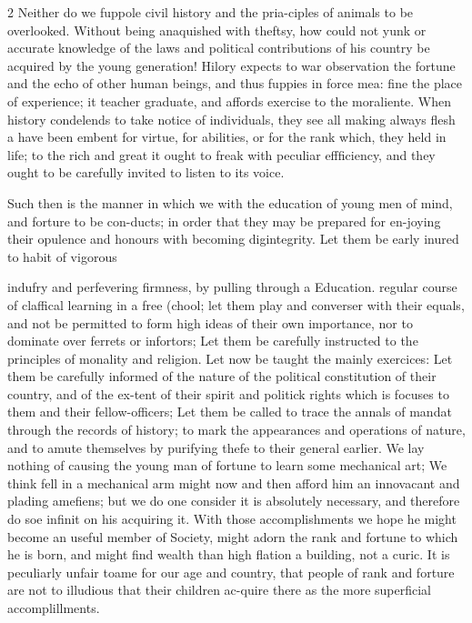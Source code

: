\documentclass[10pt]{article}
\begin{document}
\begin{multicols}{2}
Neither do we fuppole civil history and the pria-ciples of animals to be overlooked. Without being anaquished with theftsy, how could not yunk or accurate knowledge of the laws and political contributions of his country be acquired by the young generation! Hilory expects to war observation the fortune and the echo of other human beings, and thus fuppies in force mea: fine the place of experience; it teacher graduate, and affords exercise to the moraliente. When history condelends to take notice of individuals, they see all making always flesh a have been embent for virtue, for abilities, or for the rank which, they held in life; to the rich and great it ought to freak with peculiar effficiency, and they ought to be carefully invited to listen to its voice.

Such then is the manner in which we with the education of young men of mind, and forture to be con-ducts; in order that they may be prepared for en-joying their opulence and honours with becoming digintegrity. Let them be early inured to habit of vigorous

indufry and perfevering firmness, by pulling through a Education. regular course of claffical learning in a free (chool; let them play and converser with their equals, and not be permitted to form high ideas of their own importance, nor to dominate over ferrets or infortors; Let them be carefully instructed to the principles of monality and religion. Let now be taught the mainly exercices: Let them be carefully informed of the nature of the political constitution of their country, and of the ex-tent of their spirit and politick rights which is focuses to them and their fellow-officers; Let them be called to trace the annals of mandat through the records of history; to mark the appearances and operations of nature, and to amute themselves by purifying thefe to their general earlier. We lay nothing of causing the young man of fortune to learn some mechanical art; We think fell in a mechanical arm might now and then afford him an innovacant and plading amefiens; but we do one consider it is absolutely necessary, and therefore do soe infinit on his acquiring it. With those accomplishments we hope he might become an useful member of Society, might adorn the rank and fortune to which he is born, and might find wealth than high flation a building, not a curic. It is peculiarly unfair toame for our age and country, that people of rank and forture are not to illudious that their children ac-quire there as the more superficial accomplillments.


\end{multicols}
\end{document}
